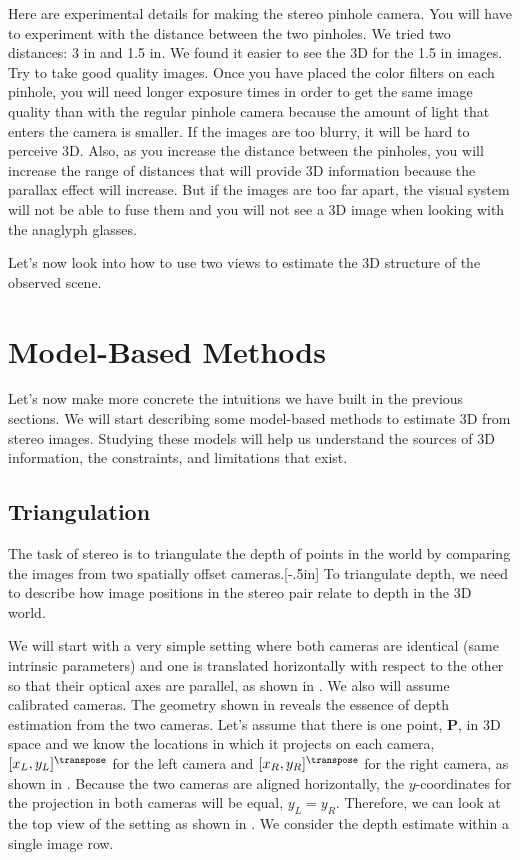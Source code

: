 Here are experimental details for making the stereo pinhole camera. You will have to experiment with the distance between the two pinholes. We tried two distances: 3 in and 1.5 in. We found it easier to see the 3D for the 1.5 in images. Try to take good quality images. Once you have placed the color filters on each pinhole, you will need longer exposure times in order to get the same image quality than with the regular pinhole camera because the amount of light that enters the camera is smaller. If the images are too blurry, it will be hard to perceive 3D. Also, as you increase the distance between the pinholes, you will increase the range of distances that will provide 3D information because the parallax effect will increase. But if the images are too far apart, the visual system will not be able to fuse them and you will not see a 3D image when looking with the anaglyph glasses.

Let's now look into how to use two views to estimate the 3D structure of the observed scene.

\section{Model-Based Methods}

Let's now make more concrete the intuitions we have built in the previous sections.
We will start describing some model-based methods to estimate 3D from stereo images. Studying these models will help us understand the sources of 3D information, the constraints, and limitations that exist.

\subsection{Triangulation}

The task of stereo is to triangulate the depth of points in the world by comparing the images from two spatially offset cameras.[-.5in]  To triangulate depth, we need to describe how image positions in the stereo pair relate to depth in the 3D world.



We will start with a very simple setting where both cameras are identical (same intrinsic parameters) and one is translated horizontally with respect to the other so that their optical axes are parallel, as shown in \fig{\ref{fig:stereo}}. We also will assume calibrated cameras.
The geometry shown in \fig{\ref{fig:stereo}} reveals the essence of depth estimation from the two cameras.
Let's assume that there is one point, $\mathbf{P}$, in 3D space and we know the locations in which it projects on each camera, $[x_L,y_L]^\transpose$ for the left camera and $[x_R,y_R]^\transpose$ for the right camera, as shown in . Because the two cameras are aligned horizontally, the $y$-coordinates for the projection in both cameras will be equal, $y_L=y_R$. Therefore, we can look at the top view of the setting as shown in . We consider the depth estimate within a single image row.

